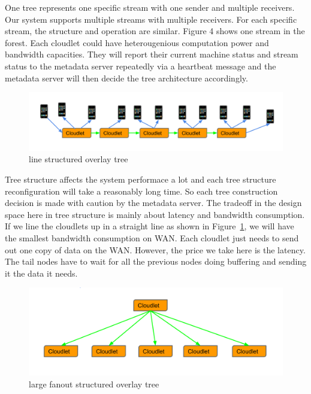 \documentclass[letterpaper,twocolumn,10pt]{article}
\begin{document}
One tree represents one specific stream with one sender and multiple receivers. Our system supports multiple streams with multiple receivers. For each specific stream, the structure and operation are similar. Figure 4 shows one stream in the forest. Each cloudlet could have heterougenious computation power and bandwidth capacities. They will report their current machine status and stream status to the metadata server repeatedly via a heartbeat message and the metadata server will then decide the tree architecture accordingly. 

\begin{figure}[t]
\begin{center}
\includegraphics[scale=0.3]{pic/line_structure.png}
\end{center}
\caption{line structured overlay tree}
\label{fig:line_structure}
\end{figure}

Tree structure affects the system performace a lot and each tree structure reconfiguration will take a reasonably long time. So each tree construction decision is made with caution by the metadata server. The tradeoff in the design space here in tree structure is mainly about latency and bandwidth consumption. If we line the cloudlets up in a straight line as shown in Figure~\ref{fig:line_structure}, we will have the smallest bandwidth consumption on WAN. Each cloudlet just needs to send out one copy of data on the WAN. However, the price we take here is the latency. The tail nodes have to wait for all the previous nodes doing buffering and sending it the data it needs. 

\begin{figure}[h]
\begin{center}
\includegraphics[scale=0.3]{pic/large_fanout.png}
\end{center}
\caption{large fanout structured overlay tree}
\label{fig:large_fanout}
\end{figure}
\end{document}

